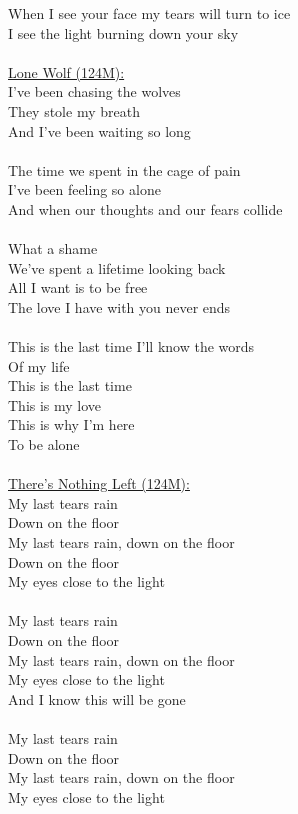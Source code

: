 \documentclass[11pt]{article}
\begin{document}
When I see your face my tears will turn to ice\\
I see the light burning down your sky\\
\\
\underline{Lone Wolf (124M):}\\
I've been chasing the wolves\\
They stole my breath\\
And I've been waiting so long\\
\\
The time we spent in the cage of pain\\
I've been feeling so alone\\
And when our thoughts and our fears collide\\
\\
What a shame\\
We've spent a lifetime looking back\\
All I want is to be free\\
The love I have with you never ends\\
\\
This is the last time I'll know the words\\
Of my life\\
This is the last time\\
This is my love\\
This is why I'm here\\
To be alone\\
\\
\underline{There’s Nothing Left (124M):}\\
My last tears rain\\
Down on the floor\\
My last tears rain, down on the floor\\
Down on the floor\\
My eyes close to the light\\
\\
My last tears rain\\
Down on the floor\\
My last tears rain, down on the floor\\
My eyes close to the light\\
And I know this will be gone\\
\\
My last tears rain\\
Down on the floor\\
My last tears rain, down on the floor\\
My eyes close to the light\\
\end{document}
